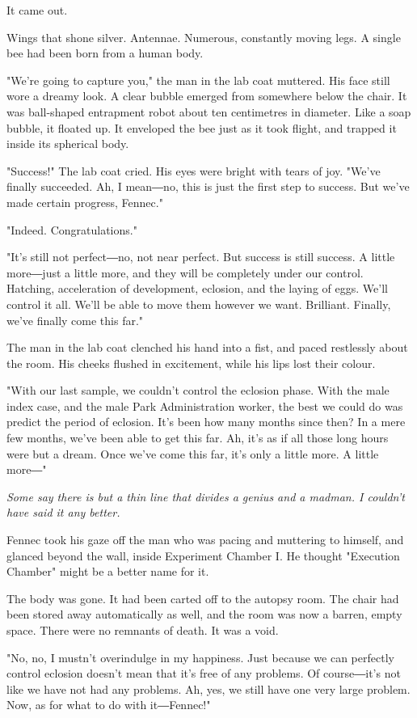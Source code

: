 It came out.

Wings that shone silver. Antennae. Numerous, constantly moving legs. A
single bee had been born from a human body.

"We're going to capture you," the man in the lab coat muttered. His face
still wore a dreamy look. A clear bubble emerged from somewhere below
the chair. It was ball-shaped entrapment robot about ten centimetres in
diameter. Like a soap bubble, it floated up. It enveloped the bee just
as it took flight, and trapped it inside its spherical body.

"Success!" The lab coat cried. His eyes were bright with tears of joy.
"We've finally succeeded. Ah, I mean―no, this is just the first step to
success. But we've made certain progress, Fennec."

"Indeed. Congratulations."

"It's still not perfect―no, not near perfect. But success is still
success. A little more―just a little more, and they will be completely
under our control. Hatching, acceleration of development, eclosion, and
the laying of eggs. We'll control it all. We'll be able to move them
however we want. Brilliant. Finally, we've finally come this far."

The man in the lab coat clenched his hand into a fist, and paced
restlessly about the room. His cheeks flushed in excitement, while his
lips lost their colour.

"With our last sample, we couldn't control the eclosion phase. With the
male index case, and the male Park Administration worker, the best we
could do was predict the period of eclosion. It's been how many months
since then? In a mere few months, we've been able to get this far. Ah,
it's as if all those long hours were but a dream. Once we've come this
far, it's only a little more. A little more―"

\emph{Some say there is but a thin line that divides a genius and a madman.
I couldn't have said it any better.}

Fennec took his gaze off the man who was pacing and muttering to
himself, and glanced beyond the wall, inside Experiment Chamber I. He
thought "Execution Chamber" might be a better name for it.~

The body was gone. It had been carted off to the autopsy room. The chair
had been stored away automatically as well, and the room was now a
barren, empty space. There were no remnants of death. It was a void.

"No, no, I mustn't overindulge in my happiness. Just because we can
perfectly control eclosion doesn't mean that it's free of any problems.
Of course―it's not like we have not had any problems. Ah, yes, we still
have one very large problem. Now, as for what to do with it―Fennec!"

